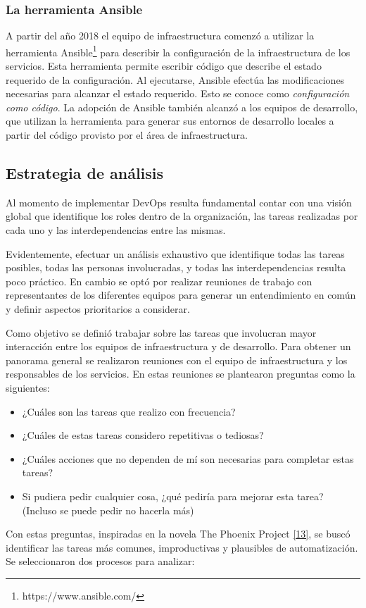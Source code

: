 \subsubsection{La herramienta Ansible}

A partir del año 2018 el equipo de infraestructura comenzó a utilizar la herramienta Ansible\footnote{ https://www.ansible.com/} para describir la configuración de la infraestructura de los servicios. Esta herramienta permite escribir código que describe el estado requerido de la configuración. Al ejecutarse, Ansible efectúa las modificaciones necesarias para alcanzar el estado requerido. Esto se conoce como \textit{configuración como código}. La adopción de Ansible también alcanzó a los equipos de desarrollo, que utilizan la herramienta para generar sus entornos de desarrollo locales a partir del código provisto por el área de infraestructura.

\subsection{Estrategia de análisis}

Al momento de implementar DevOps resulta fundamental contar con una visión global que identifique los roles dentro de la organización, las tareas realizadas por cada uno y las interdependencias entre las mismas.

Evidentemente, efectuar un análisis exhaustivo que identifique todas las tareas posibles, todas las personas involucradas, y todas las interdependencias resulta poco práctico. En cambio se optó por realizar reuniones de trabajo con representantes de los diferentes equipos para generar un entendimiento en común y definir aspectos prioritarios a considerar.

Como objetivo se definió trabajar sobre las tareas que involucran mayor interacción entre los equipos de infraestructura y de desarrollo. Para obtener un panorama general se realizaron reuniones con el equipo de infraestructura y los responsables de los servicios. En estas reuniones se plantearon preguntas como la siguientes:

\begin{itemize}
\item ¿Cuáles son las tareas que realizo con frecuencia?
\item ¿Cuáles de estas tareas considero repetitivas o tediosas?
\item ¿Cuáles acciones que no dependen de mí son necesarias para completar estas tareas?
\item Si pudiera pedir cualquier cosa, ¿qué pediría para mejorar esta tarea? (Incluso se puede pedir no hacerla más)
\end{itemize}
Con estas preguntas, inspiradas en la novela The Phoenix Project \href{https://www.zotero.org/google-docs/?eJVs0O}{[13]}, se buscó identificar las tareas más comunes, improductivas y plausibles de automatización. Se seleccionaron dos procesos para analizar:


